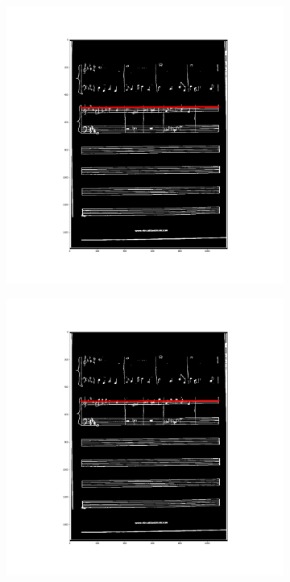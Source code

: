 \documentclass[12pt]{article}
\begin{document}
	\begin{figure}[h!]
		\begin{subfigure}[b]{0.32\linewidth}
			\includegraphics[width=\linewidth]{zdj/BFS12.png}
		\end{subfigure}
		\begin{subfigure}[b]{0.32\linewidth}
			\includegraphics[width=\linewidth]{zdj/BFS13.png}

\end{subfigure}
\end{figure}
\end{document}
